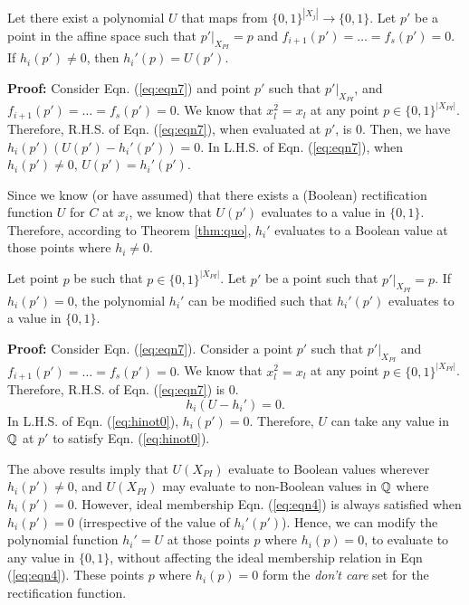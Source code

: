 \begin{Theorem}
Let there exist a polynomial $U$ that maps from $\{0,1\}^{|X_j|}
\rightarrow \{0,1\}$. Let $p'$ be a point in the affine space such
that $p'|_{X_{PI}} = p$ and $f_{i+1}(p') = \dots = f_s(p') = 0$. If
$h_i(p') \neq 0$, then $h_i'(p) = U(p')$. 
\label{thm:quo}
\end{Theorem}

\textbf{Proof:}
Consider Eqn. (\ref{eq:eqn7}) and point $p'$ such that
$p'|_{X_{PI}}$, and $f_{i+1}(p') = \dots = f_s(p') = 0$. We know that
$x_l^2 = x_l$ at any point $p \in \{0,1\}^{|X_{PI}|}$. Therefore,
R.H.S. of Eqn. (\ref{eq:eqn7}), when evaluated at $p'$, is 0. Then, we
have $h_i(p')(U(p') - h_i'(p')) = 0$.
In L.H.S. of Eqn. (\ref{eq:eqn7}), when $h_i(p') \neq 0$, $U(p') = h_i'(p')$. 

Since we know (or have assumed) that there exists a (Boolean)
rectification function $U$ for $C$ at $x_i$, we know that $U(p')$
evaluates to a value in $\{0,1\}$. Therefore, according to Theorem
\ref{thm:quo}, $h_i'$ evaluates to a Boolean value at those points
where $h_i \neq 0$.  


\begin{Corollary}
Let point $p$ be such that $p \in \{0,1\}^{|X_{PI}|}$. Let $p'$ be a
point such that $p'|_{X_{PI}} = p$. If $h_i(p') = 0$, the polynomial
$h_i'$ can be modified such that $h_i'(p')$ evaluates to a value in
$\{0,1\}$. 
\end{Corollary}

\textbf{Proof:} Consider Eqn. (\ref{eq:eqn7}). Consider a point $p'$ such that $p'|_{X_{PI}}$ and $f_{i+1}(p') = \dots = f_s(p') = 0$. We know that $x_l^2 = x_l$ at any point $p \in \{0,1\}^{|X_{PI}|}$. Therefore, R.H.S. of Eqn. (\ref{eq:eqn7}) is 0.
\begin{equation}
    h_i(U - h_i') = 0. 
    \label{eq:hinot0}
\end{equation}
In L.H.S. of Eqn. (\ref{eq:hinot0}), $h_i(p') = 0$. Therefore, $U$ can
take any value in ${\mathbb{Q}}$ at $p'$ to satisfy Eqn. (\ref{eq:hinot0}).

The above results imply that $U(X_{PI})$ evaluate to Boolean values
wherever $h_i(p') \neq 0$, and $U(X_{PI})$ may evaluate to non-Boolean
values in ${\mathbb{Q}}$ where $h_i(p')=0$. However, ideal membership
Eqn. (\ref{eq:eqn4}) is always satisfied when $h_i(p')=0$
(irrespective of the value of $h_i'(p')$). Hence, we can modify
the polynomial function $h_i'=U$ at those points $p$ where $h_i(p) =
0$, to evaluate to any  value in $\{0,1\}$, without affecting the
ideal membership relation in Eqn (\ref{eq:eqn4}). These points $p$
where $h_i(p)=0$ form the {\it don't care} set for the rectification
function.  

